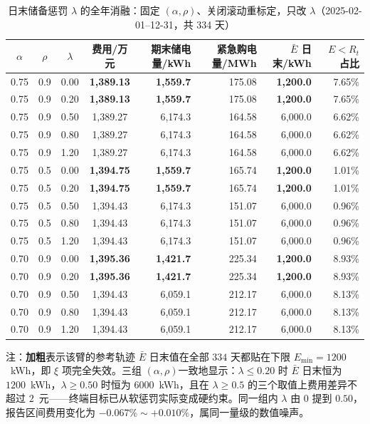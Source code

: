 \begin{table}[htbp]
  \centering
  \caption{日末储备惩罚 $\lambda$ 的全年消融：固定 $(\alpha,\rho)$、关闭滚动重标定，只改 $\lambda$（2025-02-01--12-31，共 334 天）}
  \label{tab:p2-lambda}
  \footnotesize
  \begin{tabular}{ccccrrrr}
    \toprule
    $\alpha$ & $\rho$ & $\lambda$ & 费用/万元 & 期末储电量/kWh & 紧急购电量/MWh & $\bar E$ 日末/kWh & $E<R_t$ 占比 \\
    \midrule
    0.75 & 0.9 & 0.00 & \textbf{1,389.13} & \textbf{1,559.7} & 175.08 & \textbf{1,200.0} & 7.65\% \\
    0.75 & 0.9 & 0.20 & \textbf{1,389.13} & \textbf{1,559.7} & 175.08 & \textbf{1,200.0} & 7.65\% \\
    0.75 & 0.9 & 0.50 & 1,389.27 & 6,174.3 & 164.58 & 6,000.0 & 6.62\% \\
    0.75 & 0.9 & 0.80 & 1,389.27 & 6,174.3 & 164.58 & 6,000.0 & 6.62\% \\
    0.75 & 0.9 & 1.20 & 1,389.27 & 6,174.3 & 164.58 & 6,000.0 & 6.62\% \\
    \midrule
    0.75 & 0.5 & 0.00 & \textbf{1,394.75} & \textbf{1,559.7} & 165.74 & \textbf{1,200.0} & 1.01\% \\
    0.75 & 0.5 & 0.20 & \textbf{1,394.75} & \textbf{1,559.7} & 165.74 & \textbf{1,200.0} & 1.01\% \\
    0.75 & 0.5 & 0.50 & 1,394.43 & 6,174.3 & 151.07 & 6,000.0 & 0.96\% \\
    0.75 & 0.5 & 0.80 & 1,394.43 & 6,174.3 & 151.07 & 6,000.0 & 0.96\% \\
    0.75 & 0.5 & 1.20 & 1,394.43 & 6,174.3 & 151.07 & 6,000.0 & 0.96\% \\
    \midrule
    0.70 & 0.9 & 0.00 & \textbf{1,395.36} & \textbf{1,421.7} & 225.34 & \textbf{1,200.0} & 8.93\% \\
    0.70 & 0.9 & 0.20 & \textbf{1,395.36} & \textbf{1,421.7} & 225.34 & \textbf{1,200.0} & 8.93\% \\
    0.70 & 0.9 & 0.50 & 1,394.43 & 6,059.1 & 212.17 & 6,000.0 & 8.13\% \\
    0.70 & 0.9 & 0.80 & 1,394.43 & 6,059.1 & 212.17 & 6,000.0 & 8.13\% \\
    0.70 & 0.9 & 1.20 & 1,394.43 & 6,059.1 & 212.17 & 6,000.0 & 8.13\% \\
    \bottomrule
  \end{tabular}
  \par\vspace{2pt}
  \begin{minipage}{.94\textwidth}\footnotesize
    注：\textbf{加粗}表示该臂的参考轨迹 $\bar E$ 日末值在全部 $334$ 天都贴在下限 $E_{\min}=1200$~kWh，即 $\xi$ 项完全失效。三组 $(\alpha,\rho)$一致地显示：$\lambda\le0.20$ 时 $\bar E$ 日末恒为 $1200$~kWh，$\lambda\ge0.50$ 时恒为 $6000$~kWh，且在 $\lambda\ge0.5$ 的三个取值上费用差异不超过 $2$~元——终端目标已从软惩罚实际变成硬约束。同一组内 $\lambda$ 由 $0$ 提到 $0.50$，报告区间费用变化为 $-0.067\%\sim+0.010\%$，属同一量级的数值噪声。
  \end{minipage}
\end{table}

